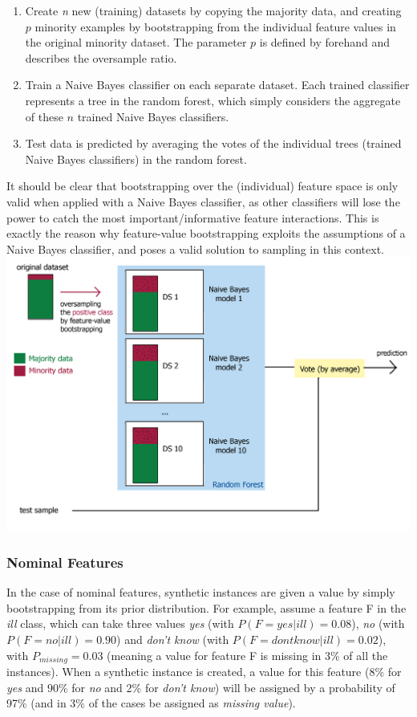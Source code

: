 \begin{enumerate}
\item Create \textit{n} new (training) datasets by copying the majority data, and creating \(p\) minority examples by bootstrapping from the individual feature values in the original minority dataset. The parameter \(p\) is defined by forehand and describes the oversample ratio.
\item Train a Naive Bayes classifier on each separate dataset. Each trained classifier represents a tree in the random forest, which simply considers the aggregate of these \(n\) trained Naive Bayes classifiers.
\item Test data is predicted by averaging the votes of the individual trees (trained Naive Bayes classifiers) in the random forest.
\end{enumerate}
It should be clear that bootstrapping over the (individual) feature space is only valid when applied with a Naive Bayes classifier, as other classifiers will lose the power to catch the most important/informative feature interactions. This is exactly the reason why feature-value bootstrapping exploits the assumptions of a Naive Bayes classifier, and poses a valid solution to sampling in this context.
\vspace{1cm}\\
\includegraphics[scale=0.65]{img/rf.png}

\newpage
\subsubsection{Nominal Features}
In the case of nominal features, synthetic instances are given a value by simply bootstrapping from its prior distribution. For example, assume a feature F in the \textit{ill} class, which can take three values \textit{yes} (with \(P(F=yes|ill)=0.08\)), \textit{no} (with \(P(F=no|ill)=0.90\)) and \textit{don't know} (with \(P(F=dont know|ill)=0.02\)), with \(P_{missing}=0.03\) (meaning a value for feature F is missing in 3\% of all the instances). When a synthetic instance is created, a value for this feature (8\% for \textit{yes} and 90\% for \textit{no} and 2\% for \textit{don't know}) will be assigned by a probability of 97\% (and in 3\% of the cases be assigned as \textit{missing value}). 

